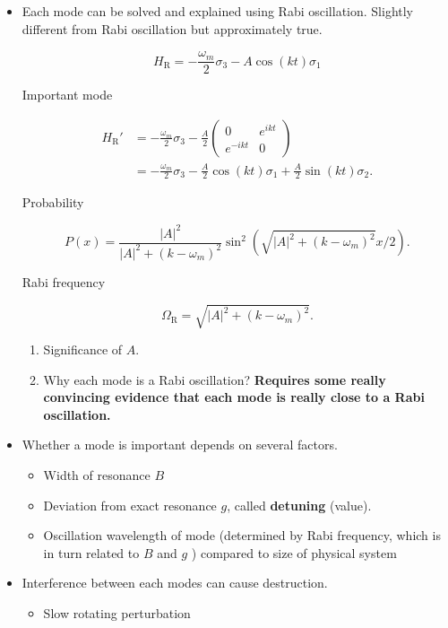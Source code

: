 \documentclass[%
preprint,
 amsmath,amssymb,
 aps,
]{revtex4-1}
\begin{document}
\begin{itemize}
    
    \item Each mode can be solved and explained using Rabi oscillation. Slightly different from Rabi oscillation but approximately true.
    
    
    



\begin{equation}
H_{\mathrm R} = -\frac{\omega_m}{2} \sigma_3 - A \cos(k t) \sigma_1
\end{equation}

Important mode

\begin{align}
H_{\mathrm R}' &= -\frac{\omega_m}{2} \sigma_3 - \frac{A}{2} \begin{pmatrix}0 & e^{i k t} \\ e^{-i k t} & 0 \end{pmatrix} \\
& =  -\frac{\omega_m}{2} \sigma_3 - \frac{A}{2} \cos(kt) \sigma_1 + \frac{A}{2} \sin (kt) \sigma_2.
\end{align}

Probability

\begin{equation}
P(x) = \frac{\lvert A\rvert^2}{ \lvert A\rvert^2 + (k - \omega_m)^2 }  \sin^2 \left( \sqrt{ \lvert A\rvert^2 + (k - \omega_m)^2 } x/2 \right).
\end{equation}

Rabi frequency

\begin{equation}
\Omega_{\mathrm R} = \sqrt{ \lvert A\rvert^2 + (k - \omega_m)^2 }.
\end{equation}




\begin{enumerate}
    \item Significance of $A$.
    \item Why each mode is a Rabi oscillation? \bf{ Requires some really convincing evidence that each mode is really close to a Rabi oscillation. }
\end{enumerate}

    
    
    
    \item Whether a mode is important depends on several factors.
        \begin{itemize}
            \item Width of resonance $B$
            \item Deviation from exact resonance $g$, called {\bf{detuning}} (value).
            \item Oscillation wavelength of mode (determined by Rabi frequency, which is in turn related to $B$ and $g$ ) compared to size of physical system
        \end{itemize}
    \item Interference between each modes can cause destruction.
        \begin{itemize}
            \item Slow rotating perturbation
            

\end{itemize}
\end{itemize}
\end{document}
